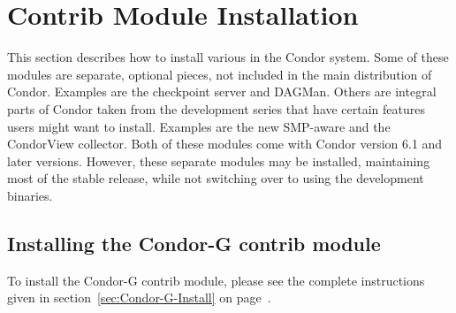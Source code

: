 \section{\label{sec:Contrib-Install}Contrib Module Installation}

This section describes how to install various 
in the Condor system.
Some of these modules are separate, optional pieces, not included in
the main distribution of Condor.
Examples are the checkpoint server and DAGMan.
Others are integral parts of Condor taken from the development series
that have certain features users might want to install.
Examples are the new SMP-aware  and the CondorView
collector.  
Both of these modules come with Condor version 6.1 and
later versions.
However, 
these separate modules may be installed,
maintaining most of the stable release,
while not
switching over to using the
development binaries.







\subsection{\label{sec:contrib-Install-Condor-G}
Installing the Condor-G contrib module} 

To install the Condor-G contrib module, please see the complete
instructions given in
section~\ref{sec:Condor-G-Install}
on page~\pageref{sec:Condor-G-Install}.


